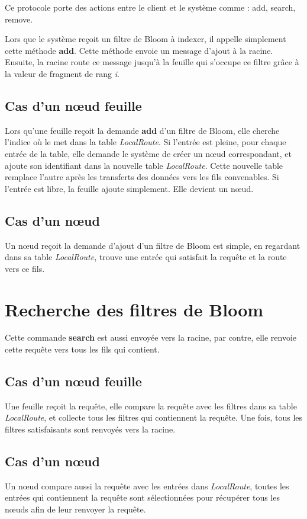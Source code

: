 \documentclass[a4paper,11pt]{report}
\begin{document}
	Ce protocole porte des actions entre le client et le système comme : add, search, remove.
	
	Lors que le système reçoit un filtre de Bloom à indexer, il appelle simplement cette méthode \textbf{add}. Cette méthode envoie un message d'ajout à la racine. Ensuite, la racine route ce message jusqu'à la feuille qui s'occupe ce filtre grâce à la valeur de fragment de rang \textit{i}.

\subsection{Cas d'un nœud feuille}
	Lors qu'une feuille reçoit la demande \textbf{add} d'un filtre de Bloom, elle cherche l'indice où le met dans la table \textit{LocalRoute}. Si l'entrée est pleine, pour chaque entrée de la table, elle demande le système de créer un nœud correspondant, et ajoute son identifiant dans la nouvelle table \textit{LocalRoute}. Cette nouvelle table remplace l'autre après les transferts des données vers les fils convenables. Si l'entrée est libre, la feuille ajoute simplement. Elle devient un nœud.
	
\subsection{Cas d'un nœud}
	Un nœud reçoit la demande d'ajout d'un filtre de Bloom est simple, en regardant dans sa table \textit{LocalRoute}, trouve une entrée qui satisfait la requête et la route vers ce fils.
	
\section{Recherche des filtres de Bloom}
	Cette commande \textbf{search} est aussi envoyée vers la racine, par contre, elle renvoie cette requête vers tous les fils qui contient.
	
\subsection{Cas d'un nœud feuille}
	Une feuille reçoit la requête, elle compare la requête avec les filtres dans sa table \textit{LocalRoute}, et collecte tous les filtres qui contiennent la requête. Une fois, tous les filtres satisfaisants sont renvoyés vers la racine.

\subsection{Cas d'un nœud}
	Un nœud compare aussi la requête avec les entrées dans \textit{LocalRoute}, toutes les entrées qui contiennent la requête sont sélectionnées pour récupérer tous les nœuds afin de leur renvoyer la requête.
	
\end{document}
